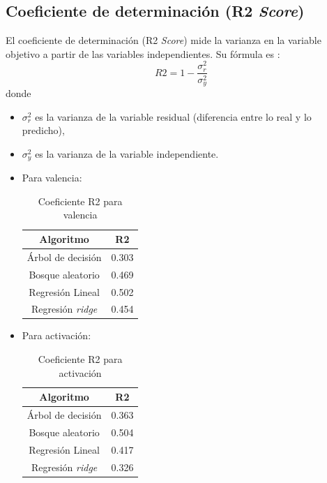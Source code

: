 \documentclass[12pt,a4paper,Spanish]{article}
\begin{document}
\subsection{Coeficiente de determinación (R2 \textit{Score})}
El coeficiente de determinación (R2 \textit{Score}) mide la varianza en la variable objetivo a  partir de las variables independientes. Su fórmula es \cite{eswiki:158364923}:
\begin{equation}
	R2 = 1 - \frac{\sigma^{2}_r}{\sigma^{2}_y} 
\end{equation}
donde
\begin{itemize}
	\item $\sigma^{2}_r$ es la varianza de la variable residual (diferencia entre lo real y lo predicho),
	\item $\sigma^{2}_y$ es la varianza de la variable independiente.
\end{itemize}
\begin{itemize}
	\item Para valencia:
	\begin{table}[H]
		\centering
		\caption{Coeficiente R2 para valencia}
		\begin{tabular}{|c|c|}
			\hline
			\textbf{Algoritmo} & \textbf{R2} \\
			\hline
			Árbol de decisión & 0.303 \\
			Bosque aleatorio & 0.469 \\
			Regresión Lineal & 0.502 \\
			Regresión \textit{ridge} & 0.454 \\
			\hline
		\end{tabular}
	\end{table}
	\item Para activación:
	\begin{table}[H]
		\centering
		\caption{Coeficiente R2 para activación}
		\begin{tabular}{|c|c|}
			\hline
			\textbf{Algoritmo} & \textbf{R2} \\
			\hline
			Árbol de decisión & 0.363 \\
			Bosque aleatorio & 0.504 \\
			Regresión Lineal & 0.417 \\
			Regresión \textit{ridge} & 0.326 \\
			\hline
		\end{tabular}
	\end{table}
\end{itemize}
\end{document}
